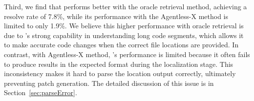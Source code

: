 
Third, we find that \Claude performs better with the oracle retrieval method, achieving a resolve rate of 7.8\%, while its performance with the Agentless-X method is limited to only 1.9\%. We believe this higher performance with oracle retrieval is due to \Claude's strong capability in understanding long code segments, which allows it to make accurate code changes when the correct file locations are provided. In contrast, with Agentless-X method, \Claude's performance is limited because it often fails to produce results in the expected format during the localization stage. This inconsistency makes it hard to parse the location output correctly, ultimately preventing patch generation. The detailed discussion of this issue is in Section~\ref{sec:parseError}.




